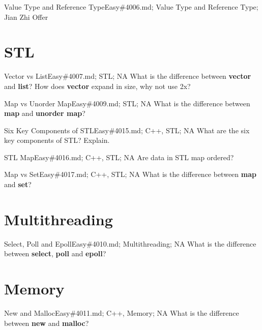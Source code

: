 \documentclass[oldfontcommands]{memoir}
\begin{document}
{\begin{question}{Value Type and Reference Type}{Easy}{\#4006.md; Value Type and Reference Type; Jian Zhi Offer}
\end{question}

\section{STL}
\begin{question}{Vector vs List}{Easy}{\#4007.md; STL; NA}
What is the difference between {\bf{vector}} and {\bf{list}}? How does {\bf{vector}} expand in size, why not use 2x?

\end{question}

\begin{question}{Map vs Unorder Map}{Easy}{\#4009.md; STL; NA}
What is the difference between {\bf{map}} and {\bf{unorder map}}?

\end{question}

\begin{question}{Six Key Components of STL}{Easy}{\#4015.md; C++, STL; NA}
What are the six key components of STL? Explain.

\end{question}

\begin{question}{STL Map}{Easy}{\#4016.md; C++, STL; NA}
Are data in STL map ordered?

\end{question}

\begin{question}{Map vs Set}{Easy}{\#4017.md; C++, STL; NA}
What is the difference between {\bf{map}} and {\bf{set}}?

\end{question}

\section{Multithreading}
\begin{question}{Select, Poll and Epoll}{Easy}{\#4010.md; Multithreading; NA}
What is the difference between {\bf{select}}, {\bf{poll}} and {\bf{epoll}}?

\end{question}

\section{Memory}
\begin{question}{New and Malloc}{Easy}{\#4011.md; C++, Memory; NA}
What is the difference between {\bf{new}} and {\bf{malloc}}?


\end{question}}
\end{document}
